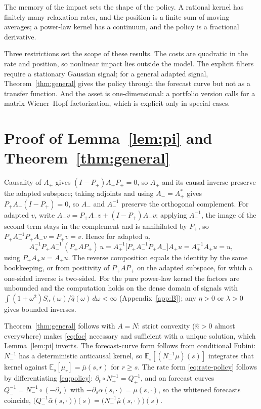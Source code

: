 \documentclass[11pt]{article}
\newcommand{\E}{\mathbb{E}}
\theoremstyle{plain}
\theoremstyle{definition}
\theoremstyle{remark}
\begin{document}
The memory of the impact sets the shape of the policy. A rational kernel has finitely many relaxation rates, and the position is a finite sum of moving averages; a power-law kernel has a continuum, and the policy is a fractional derivative.

Three restrictions set the scope of these results. The costs are quadratic in the rate and position, so nonlinear impact lies outside the model. The explicit filters require a stationary Gaussian signal; for a general adapted signal, Theorem~\ref{thm:general} gives the policy through the forecast curve but not as a transfer function. And the asset is one-dimensional: a portfolio version calls for a matrix Wiener--Hopf factorization, which is explicit only in special cases.

\appendix

\section{Proof of Lemma~\ref{lem:pi} and Theorem~\ref{thm:general}}\label{app:A}
Causality of $A_+$ gives $(I-P_+)A_+P_+=0$, so $A_+$ and its causal inverse preserve the adapted subspace; taking adjoints and using $A_-=A_+^*$ gives $P_+A_-(I-P_+)=0$, so $A_-$ and $A_-^{-1}$ preserve the orthogonal complement. For adapted $v$, write $A_-v=P_+A_-v+(I-P_+)A_-v$; applying $A_-^{-1}$, the image of the second term stays in the complement and is annihilated by $P_+$, so $P_+A_-^{-1}P_+A_-v=P_+v=v$. Hence for adapted $u$,
\[
A_+^{-1}P_+A_-^{-1}\,(P_+AP_+)\,u = A_+^{-1}\bigl[P_+A_-^{-1}P_+A_-\bigr]A_+u = A_+^{-1}A_+u = u,
\]
using $P_+A_+u=A_+u$. The reverse composition equals the identity by the same bookkeeping, or from positivity of $P_+AP_+$ on the adapted subspace, for which a one-sided inverse is two-sided. For the pure power-law kernel the factors are unbounded and the computation holds on the dense domain of signals with $\int(1+\omega^2)S_\alpha(\omega)/\hat q(\omega)\,d\omega<\infty$ (Appendix~\ref{app:B}); any $\eta>0$ or $\lambda>0$ gives bounded inverses.

Theorem~\ref{thm:general} follows with $A=N$: strict convexity ($\hat n>0$ almost everywhere) makes \eqref{eq:foc} necessary and sufficient with a unique solution, which Lemma~\ref{lem:pi} inverts. The forecast-curve form follows from conditional Fubini: $N_-^{-1}$ has a deterministic anticausal kernel, so $\E_s[(N_-^{-1}\mu)(s)]$ integrates that kernel against $\E_s[\mu_r]=\bar\mu(s,r)$ for $r\ge s$. The rate form \eqref{eq:rate-policy} follows by differentiating \eqref{eq:policy}: $\partial_t\circ N_+^{-1}=Q_+^{-1}$, and on forecast curves $Q_-^{-1}=N_-^{-1}\circ(-\partial_s)$ with $-\partial_s\bar\alpha(s,\cdot)=\bar\mu(s,\cdot)$, so the whitened forecasts coincide, $\bigl(Q_-^{-1}\bar\alpha(s,\cdot)\bigr)(s)=\bigl(N_-^{-1}\bar\mu(s,\cdot)\bigr)(s)$.
\end{document}
